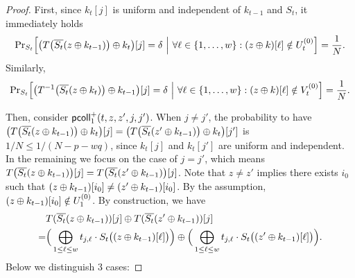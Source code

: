 \begin{proof}
	First, since $k_t[j]$ is uniform and independent of $k_{t-1}$ and $S_t$, it immediately holds
	$${\Pr}_{S_t}\Big[\big(T\big(\overline{S_t}(z\oplus k_{t-1})\big)\oplus k_t\big)[j]=\delta ~\Big|~\forall\ell\in\{1,\ldots,w\}:(z\oplus k)[\ell]\notin U_t^{(0)}\Big]=\frac{1}{N}.$$
	Similarly,
	$${\Pr}_{S_t}\Big[\big(T^{-1}\big(\overline{S_t}(z\oplus k_t)\big)\oplus k_{t-1}\big)[j]=\delta ~\Big|~\forall\ell\in\{1,\ldots,w\}:(z\oplus k)[\ell]\notin V_t^{(0)}\Big]=\frac{1}{N}.$$
	
	
	
	
	
	
	\arrangespace
	
	
	Then, consider $\mathsf{pcoll}_{1}^+(t,z,z',j,j')$. When $j\neq j'$, the probability to have
	$\big(T\big(\overline{S_t}(z\oplus k_{t-1})\big)\oplus k_t\big)[j]=\big(T\big(\overline{S_t}(z'\oplus k_{t-1})\big)\oplus k_t\big)[j']$ is $1/N\leq 1/(N-p-wq)$, since $k_t[j]$ and $k_t[j']$ are uniform and independent. In the remaining we focus on the case of $j=j'$, which means $T\big(\overline{S_t}(z\oplus k_{t-1})\big)[j]=T\big(\overline{S_t}(z'\oplus k_{t-1})\big)[j]$. Note that $z\neq z'$ implies there exists $i_0$ such that $(z\oplus k_{t-1})[i_0]\neq(z'\oplus k_{t-1})[i_0]$. By the assumption, $(z\oplus k_{t-1})[i_0]\notin U_1^{(0)}$. By construction, we have
	\begin{align*}
	&  T(\overline{S_t}(z\oplus k_{t-1}))[j]\oplus T(\overline{S_t}(z'\oplus k_{t-1}))[j]       \\
	= &
	\Big(\bigoplus_{1\leq\ell\leq w}t_{j,\ell}\cdot S_t\big((z\oplus k_{t-1})[\ell]\big)\Big)\oplus
	\Big(\bigoplus_{1\leq\ell\leq w}t_{j,\ell}\cdot S_t\big((z'\oplus k_{t-1})[\ell]\big)\Big)   .
	\end{align*}
	Below we distinguish 3 cases:
	

\end{proof}
